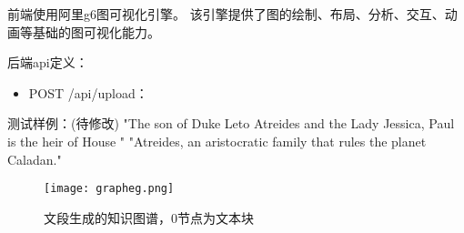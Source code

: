 \documentclass{xmu}
\begin{document}
        前端使用阿里g6图可视化引擎。
        该引擎提供了图的绘制、布局、分析、交互、动画等基础的图可视化能力。

        后端api定义：
        \begin{itemize}
            \item POST /api/upload：
        \end{itemize}

        测试样例：(待修改)
        "The son of Duke Leto Atreides and the Lady Jessica, Paul is the heir of House "
        "Atreides, an aristocratic family that rules the planet Caladan."
        \begin{figure}[!htb]
            \centering
            \texttt{[image: grapheg.png]}\\
            \caption{文段生成的知识图谱，0节点为文本块}\label{}
        \end{figure}
\end{document}
